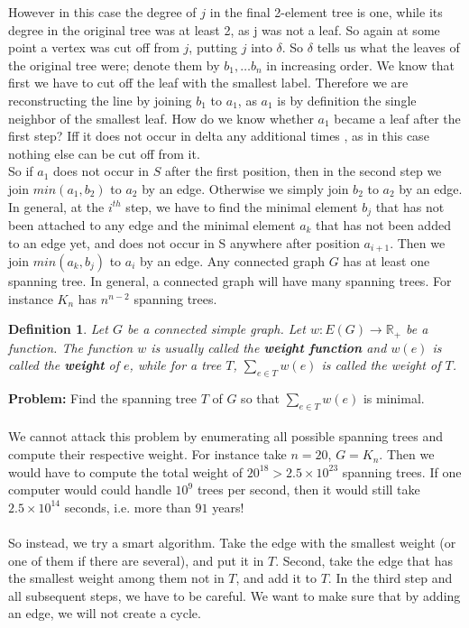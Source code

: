 \documentclass[12pt,a4paper]{article}
\newtheorem{defn}{Definition}[section]
\theoremstyle{definition}
\begin{document}
However in this case the degree of $j$ in the final 2-element tree is one, while its degree in the original tree was at least 2, as j was not a leaf. So again at some point a vertex was cut off from $j$, putting $j$ into $\delta$. 
So $\delta$ tells us what the leaves of the original tree were; denote them by $b_1, \dots b_n$ in increasing order. We know that first we have to cut off the leaf with the smallest label. Therefore we are reconstructing the line by joining $b_1$ to $a_1$, as $a_1$ is by definition the single neighbor of the smallest leaf. How do we know whether $a_1$ became a leaf after the first step? Iff it does not occur in delta any additional times , as in this case nothing else can be cut off from it.\\
So if $a_1$ does not occur in $S$ after the first position, then in the second step we join $min(a_1,b_2)$ to $a_2$ by an edge. Otherwise we simply join $b_2$ to $a_2$ by an edge. In general, at the $i^{th}$ step, we have to find the minimal element $b_j$ that has not been attached to any edge and the minimal element $a_k$ that has not been added to an edge yet, and does not occur in S anywhere after position $a_{i+1}$. Then we join $min(a_k,b_j)$ to $a_i$ by an edge.
\newpage
Any connected graph $G$ has at least one spanning tree. In general, a connected graph will have many spanning trees. For instance $K_n$ has $n^{n-2}$ spanning trees. 
\begin{defn} Let $G$ be a connected simple graph. Let $w: E(G) \to \mathbb{R}_+$ be a function. The function $w$ is usually called the \textbf{weight function} and $w(e)$ is called the \textbf{weight} of $e$, while for a tree $T$, $\sum_{e \in T} w(e)$ is called the weight of $T$. 
\end{defn}
\textbf{Problem:} Find the spanning tree $T$ of $G$ so that $\sum_{e \in T} w(e)$ is minimal.
\\\\
We cannot attack this problem by enumerating all possible spanning trees and compute their respective weight. For instance take $n=20$, $G=K_n$. Then we would have to compute the total weight of $20^{18} > 2.5 \times 10^{23}$ spanning trees. If one computer would could handle $10^9$ trees per second,  then it would still take $2.5 \times 10^{14}$ seconds, i.e. more than $91$ years!\\
\\
So instead, we try a smart algorithm. Take the edge with the smallest weight (or one of them if there are several), and put it in $T$. Second, take the edge that has the smallest weight among them not in $T$, and add it to $T$. In the third step and all subsequent steps,  we have to be careful. We want to make sure that by adding an edge, we will not create a cycle. 
\end{document}
